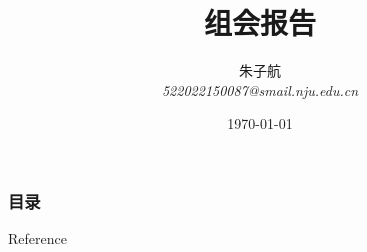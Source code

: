 \documentclass{njupre/njupre}
\title[组会报告]{组会报告}
\author[朱子航]{\texorpdfstring{朱子航 \\ \smallskip \textit{522022150087@smail.nju.edu.cn}}{}}
\date[\today]{\texorpdfstring{\today}{}}
\begin{document}
\begin{frame}
    \titlepage
\end{frame}

\begin{frame}
    \frametitle{目录}
    \tableofcontents
\end{frame}


\begin{frame}[allowframebreaks]{Reference}
    
    
\end{frame}
\end{document}

